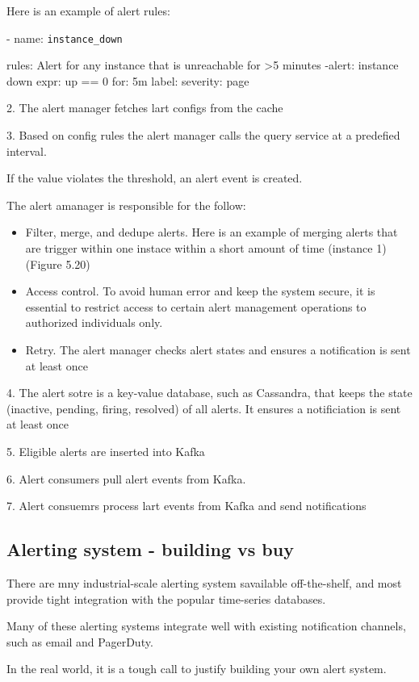 \documentclass{report}
\theoremstyle{definition}
\let\oldsubsection\subsection
\renewcommand{\subsection}{\oldsubsection*}
\begin{document}
Here is an example of alert rules:

- name: \lstinline{instance_down}

rules:
Alert for any instance that is unreachable for >5 minutes
-alert: instance down
  expr: up == 0
  for: 5m
  label:
  severity: page

2. The alert manager fetches lart configs from the cache

3. Based on config rules the alert manager calls the query service at a predefied interval.

If the value violates the threshold, an alert event is created.

The alert amanager is responsible for the follow:

\begin{itemize}
\item
Filter, merge, and dedupe alerts. Here is an example of merging alerts that are trigger within one instace within a short amount of time (instance 1) (Figure 5.20)
\item
Access control. To avoid human error and keep the system secure, it is essential to restrict access to certain alert management operations to authorized individuals only.
\item
Retry. The alert manager checks alert states and ensures a notification is sent at least once
\end{itemize}

4. The alert sotre is a key-value database, such as Cassandra, that keeps the state (inactive, pending, firing, resolved) of all alerts. It ensures a notificiation is sent at least once

5. Eligible alerts are inserted into Kafka

6. Alert consumers pull alert events from Kafka.

7. Alert consuemrs process lart events from Kafka and send notifications

\subsection{Alerting system - building vs buy}

There are mny industrial-scale alerting system savailable off-the-shelf, and most provide tight integration with the popular time-series databases.

Many of these alerting systems integrate well with existing notification channels, such as email and PagerDuty.

In the real world, it is a tough call to justify building your own alert system.
\end{document}
